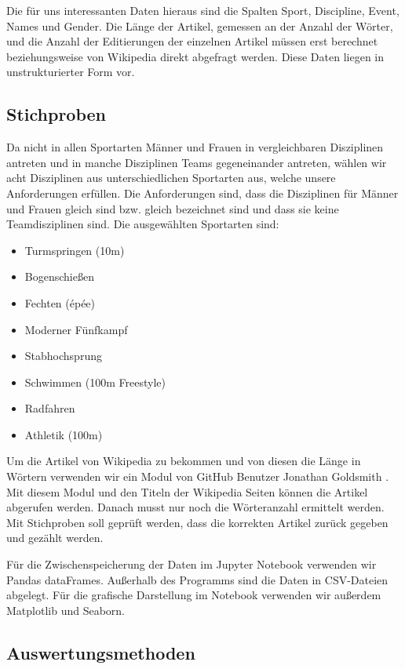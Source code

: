\documentclass[11pt]{article}
\begin{document}
Die für uns interessanten Daten hieraus sind die Spalten Sport, Discipline, Event, Names und Gender.
Die Länge der Artikel, gemessen an der Anzahl der Wörter, und die Anzahl der Editierungen der einzelnen Artikel müssen erst berechnet beziehungsweise von Wikipedia direkt abgefragt werden. Diese Daten liegen in unstrukturierter Form vor.

\subsection*{Stichproben}
Da nicht in allen Sportarten Männer und Frauen in vergleichbaren Disziplinen antreten und in manche Disziplinen Teams gegeneinander antreten, wählen wir acht Disziplinen aus unterschiedlichen Sportarten aus, welche unsere Anforderungen erfüllen. Die Anforderungen sind, dass die Disziplinen für Männer und Frauen gleich sind bzw. gleich bezeichnet sind und dass sie keine Teamdisziplinen sind.
Die ausgewählten Sportarten sind:
\begin{itemize}
\item Turmspringen (10m)
\item Bogenschießen
\item Fechten (épée)
\item Moderner Fünfkampf
\item Stabhochsprung
\item Schwimmen (100m Freestyle)
\item Radfahren
\item Athletik (100m)
\end{itemize}

Um die Artikel von Wikipedia zu bekommen und von diesen die Länge in Wörtern verwenden wir ein Modul von GitHub Benutzer Jonathan Goldsmith \cite{goldsmith}. Mit diesem Modul und den Titeln der Wikipedia Seiten können die Artikel abgerufen werden. Danach musst nur noch die Wörteranzahl ermittelt werden. Mit Stichproben soll geprüft werden, dass die korrekten Artikel zurück gegeben und gezählt werden.

Für die Zwischenspeicherung der Daten im Jupyter Notebook verwenden wir Pandas dataFrames. Außerhalb des Programms sind die Daten in CSV-Dateien abgelegt. Für die grafische Darstellung im Notebook verwenden wir außerdem Matplotlib\parencite{matplotlib} und Seaborn\parencite{seaborn}.

\subsection*{Auswertungsmethoden}
\end{document}
